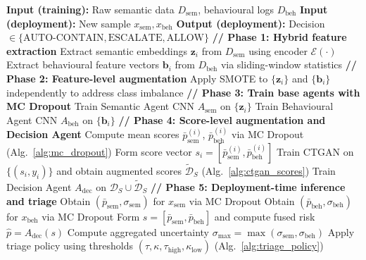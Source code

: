 \documentclass[3p]{elsarticle}
\begin{document}
\begin{algorithm}[t]
\caption{Agentic SABRE: Training and Deployment Pipeline}
\label{alg:agentic_sabre_pipeline}
\begin{algorithmic}[1]
    \State \textbf{Input (training):} Raw semantic data $D_{\text{sem}}$, behavioural logs $D_{\text{beh}}$
    \State \textbf{Input (deployment):} New sample $x_{\text{sem}}, x_{\text{beh}}$
    \State \textbf{Output (deployment):} Decision $\in \{\text{AUTO-CONTAIN}, \text{ESCALATE}, \text{ALLOW}\}$
    \vspace{1mm}
    \Statex \textbf{// Phase 1: Hybrid feature extraction}
    \State Extract semantic embeddings $\mathbf{z}_i$ from $D_{\text{sem}}$ using encoder $\mathcal{E}(\cdot)$
    \State Extract behavioural feature vectors $\mathbf{b}_i$ from $D_{\text{beh}}$ via sliding-window statistics
    \vspace{1mm}
    \Statex \textbf{// Phase 2: Feature-level augmentation}
    \State Apply SMOTE to $\{\mathbf{z}_i\}$ and $\{\mathbf{b}_i\}$ independently to address class imbalance
    \vspace{1mm}
    \Statex \textbf{// Phase 3: Train base agents with MC Dropout}
    \State Train Semantic Agent CNN $A_{\text{sem}}$ on $\{\mathbf{z}_i\}$
    \State Train Behavioural Agent CNN $A_{\text{beh}}$ on $\{\mathbf{b}_i\}$
    \vspace{1mm}
    \Statex \textbf{// Phase 4: Score-level augmentation and Decision Agent}
        \State Compute mean scores $\bar{p}_{\text{sem}}^{(i)}$, $\bar{p}_{\text{beh}}^{(i)}$ via MC Dropout (Alg.~\ref{alg:mc_dropout})
        \State Form score vector $s_i = [\bar{p}_{\text{sem}}^{(i)}, \bar{p}_{\text{beh}}^{(i)}]$
    \EndFor
    \State Train CTGAN on $\{(s_i, y_i)\}$ and obtain augmented scores $\tilde{\mathcal{D}}_S$ (Alg.~\ref{alg:ctgan_scores})
    \State Train Decision Agent $A_{\text{dec}}$ on $\mathcal{D}_S \cup \tilde{\mathcal{D}}_S$
    \vspace{1mm}
    \Statex \textbf{// Phase 5: Deployment-time inference and triage}
    \State Obtain $(\bar{p}_{\text{sem}}, \sigma_{\text{sem}})$ for $x_{\text{sem}}$ via MC Dropout
    \State Obtain $(\bar{p}_{\text{beh}}, \sigma_{\text{beh}})$ for $x_{\text{beh}}$ via MC Dropout
    \State Form $s = [\bar{p}_{\text{sem}}, \bar{p}_{\text{beh}}]$ and compute fused risk $\hat{p} = A_{\text{dec}}(s)$
    \State Compute aggregated uncertainty $\sigma_{\max} = \max(\sigma_{\text{sem}}, \sigma_{\text{beh}})$
    \State Apply triage policy using thresholds $(\tau, \kappa, \tau_{\text{high}}, \kappa_{\text{low}})$ (Alg.~\ref{alg:triage_policy})
\end{algorithmic}
\end{algorithm}
\end{document}
